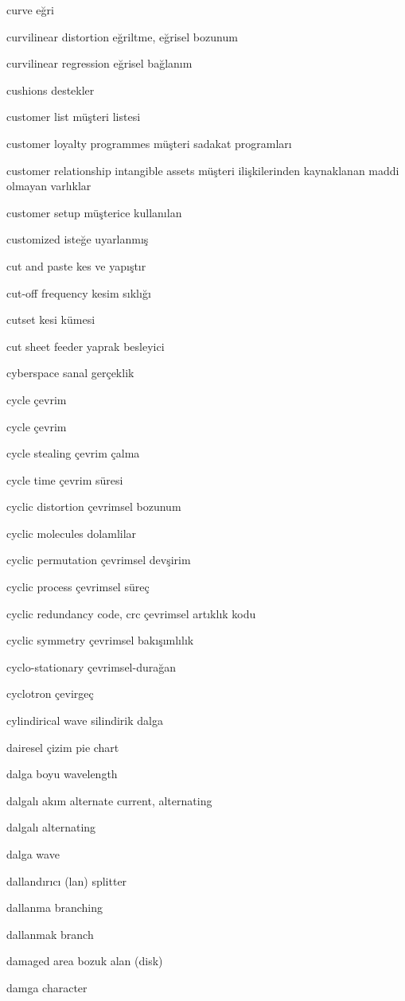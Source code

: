 \documentclass[12pt,fleqn]{article}\usepackage{../../common}
\begin{document}
curve eğri

curvilinear distortion eğriltme, eğrisel bozunum

curvilinear regression eğrisel bağlanım

cushions destekler

customer list müşteri listesi

customer loyalty programmes müşteri sadakat programları

customer relationship intangible assets müşteri ilişkilerinden kaynaklanan maddi olmayan varlıklar

customer setup müşterice kullanılan

customized isteğe uyarlanmış

cut and paste kes ve yapıştır

cut-off frequency kesim sıklığı

cutset kesi kümesi

cut sheet feeder yaprak besleyici

cyberspace sanal gerçeklik

cycle çevrim

cycle çevrim

cycle stealing çevrim çalma

cycle time çevrim süresi

cyclic distortion çevrimsel bozunum

cyclic molecules dolamlilar

cyclic permutation çevrimsel devşirim

cyclic process çevrimsel süreç

cyclic redundancy code, crc çevrimsel artıklık kodu

cyclic symmetry çevrimsel bakışımlılık

cyclo-stationary çevrimsel-durağan

cyclotron çevirgeç

cylindirical wave silindirik dalga

dairesel çizim pie chart

dalga boyu wavelength

dalgalı akım alternate current, alternating

dalgalı alternating

dalga wave

dallandırıcı (lan) splitter

dallanma branching

dallanmak branch

damaged area bozuk alan (disk)

damga character
\end{document}

